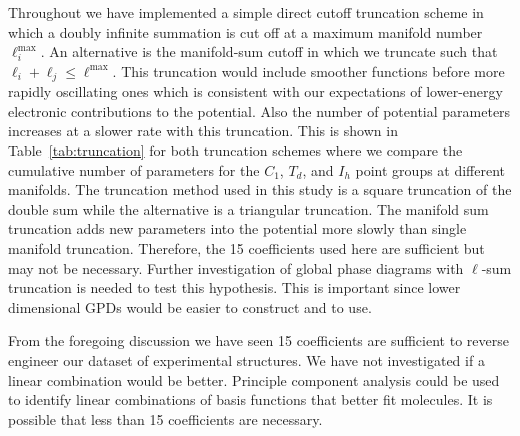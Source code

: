 \documentclass[preprint]{revtex4}
\newcommand{\mb}[1]{\ensuremath{\mbox{\boldmath $ #1 $}}}
\begin{document}
Throughout we have implemented a simple direct cutoff truncation
scheme in which a doubly infinite summation is cut off at a maximum
manifold number $\ell_i^\mathrm{max}$.  An alternative is the
manifold-sum cutoff in which we truncate such that $\ell_i+\ell_j\le
\ell^\mathrm{max}$. This truncation would include smoother functions
before more rapidly oscillating ones which is consistent with our
expectations of lower-energy electronic contributions to the
potential. Also the number of potential parameters increases at a
slower rate with this truncation. This is shown in
Table~\ref{tab:truncation} for both truncation schemes where we
compare the cumulative number of parameters for the $C_1$, $T_d$,
and $I_h$ point groups at different manifolds. The truncation method
used in this study is a square truncation of the double sum while
the alternative is a triangular truncation. The manifold sum
truncation adds new parameters into the potential more slowly than
single manifold truncation. Therefore, the 15 coefficients used here
are sufficient but may not be necessary. Further investigation of
global phase diagrams with $\ell$-sum truncation is needed to test
this hypothesis. This is important since lower dimensional GPDs
would be easier to construct and to use.

From the foregoing discussion we have seen 15 coefficients are
sufficient to reverse engineer our dataset of experimental
structures.  We have not investigated if a linear combination would
be better.  Principle component analysis could be used to identify
linear combinations of basis functions that better fit molecules. It
is possible that less than 15 coefficients are necessary.


\end{document}
